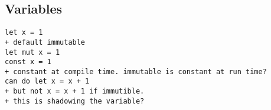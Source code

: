 
\subsection{Variables}

\begin{verbatim}
let x = 1
+ default immutable
let mut x = 1
const x = 1
+ constant at compile time. immutable is constant at run time?
can do let x = x + 1
+ but not x = x + 1 if immutible.
+ this is shadowing the variable?

\end{verbatim}
